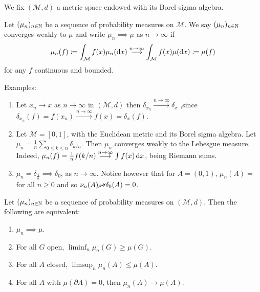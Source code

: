 \documentclass{article}
\begin{document}
We fix $  (\mathcal{M}, d)$ a metric space endowed with its Borel sigma algebra.

\begin{boxdef}\label{def: weak convergence of measures}
Let $ (\mu_{n})_{n\in \mathbb{N}}$ be a sequence of probability measures on $ \mathcal{M}$. We say $ (\mu_{n})_{n\in \mathbb{N}}$ converges weakly to $ \mu$ and write $\mu_{n}\implies \mu$ as $ n\to \infty$ if 
\[
	\mu_{n}(f) \coloneqq \int_{\mathcal{M}} f(x) \mu_{n}(\operatorname{d}\!  x) \stackrel{n\to \infty}{\longrightarrow} \int_{ \mathcal{M}} f(x) \mu(\operatorname{d}\!  x) \coloneqq \mu(f)
\]
for any $ f$ continuous and bounded.

\end{boxdef}


\begin{examplesblock}{Examples: }\label{examples: 8}
\begin{enumerate}
	\item Let $ x_{n}\to x$ as $ n\to \infty$ in $ ( \mathcal{M}, d)$ then $ \delta_{x_{n}}\stackrel{n\to \infty}{\longrightarrow}\delta_{x}$ ,since $ \delta_{x_{n}}(f)= f(x_{n})\stackrel{n\to \infty}{\longrightarrow}f(x) = \delta_{x}(f)$. 
	\item Let $  \mathcal{M} = [0,1]$, with the Euclidean metric and its Borel sigma algebra. Let $ \mu_{n} = \frac{1}{n}\displaystyle\sum_{0\leq k\leq n}\delta_{k/n} $. Then $ \mu_{n}$ converges weakly to the Lebesgue measure. Indeed, $ \mu_{n}(f) = \frac{1}{n}f(k/n)\stackrel{n\to \infty}{\longrightarrow}\int f(x) \operatorname{d}\! x$, being Riemann sums.
	\item $ \mu_{n} = \delta_{\frac{1}{n}}\implies \delta_{0}$, as $ n\to \infty$. Notice however that for $ A = (0,1)$, $ \mu_{n}(A) = $ for all $ n\geq 0$ and so $ \nu_{n}(A) \cancel{\rightarrow} \delta_{0}(A) = 0$.
\end{enumerate}

\end{examplesblock}


\begin{theorem}\label{thm: weak convergence equivalence}
Let $ (\mu_{n})_{n\in \mathbb{N}}$ be a sequence of probability measures on $ ( \mathcal{M}, d)$. Then the following are equivalent: 
\begin{enumerate}
	\item $ \mu_{n}\implies \mu$.
    \item For all $ G$ open, $ \displaystyle\liminf_{n}\mu_{n}(G)\geq \mu(G)$.
    \item For all $ A$ closed, $ \displaystyle\limsup_{ n} \mu_{n}(A)\leq \mu(A)$.
    \item For all $ A$ with $ \mu(\partial A) = 0$, then $ \mu_{n}(A)\to \mu(A)$. 
\end{enumerate}

\end{theorem}
\end{document}
